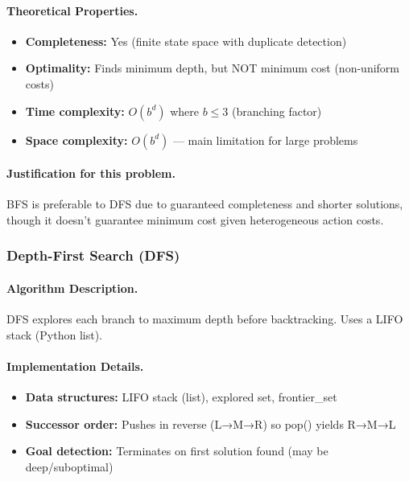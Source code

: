 \documentclass[11pt,a4paper]{article}
\begin{document}
\paragraph{Theoretical Properties.}
\begin{itemize}[leftmargin=1.5cm,itemsep=0.1em]
    \item \textbf{Completeness:} Yes (finite state space with duplicate detection)
    \item \textbf{Optimality:} Finds minimum depth, but NOT minimum cost (non-uniform costs)
    \item \textbf{Time complexity:} $O(b^d)$ where $b \leq 3$ (branching factor)
    \item \textbf{Space complexity:} $O(b^d)$ --- main limitation for large problems
\end{itemize}

\paragraph{Justification for this problem.}
BFS is preferable to DFS due to guaranteed completeness and shorter solutions, though it doesn't guarantee minimum cost given heterogeneous action costs.

\subsubsection{Depth-First Search (DFS)}

\paragraph{Algorithm Description.}
DFS explores each branch to maximum depth before backtracking. Uses a LIFO stack (Python list).

\paragraph{Implementation Details.}
\begin{itemize}[leftmargin=1.5cm,itemsep=0.1em]
    \item \textbf{Data structures:} LIFO stack (list), explored set, frontier\_set
    \item \textbf{Successor order:} Pushes in reverse (L→M→R) so pop() yields R→M→L
    \item \textbf{Goal detection:} Terminates on first solution found (may be deep/suboptimal)
\end{itemize}
\end{document}
